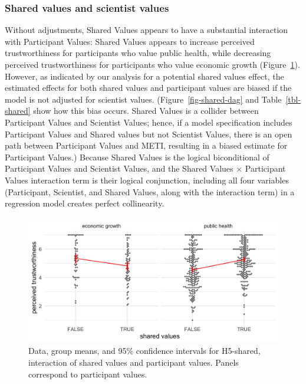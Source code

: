 \documentclass[
  letterpaper,
  DIV=11,
  numbers=noendperiod]{scrartcl}
\begin{document}
\hypertarget{shared-values-and-scientist-values}{%
\subsubsection{Shared values and scientist
values}\label{shared-values-and-scientist-values}}

Without adjustments, Shared Values appears to have a substantial
interaction with Participant Values: Shared Values appears to increase
perceived trustworthiness for participants who value public health,
while decreasing perceived trustworthiness for participants who value
economic growth (Figure~\ref{fig-shared-part}). However, as indicated by
our analysis for a potential shared values effect, the estimated effects
for both shared values and participant values are biased if the model is
not adjusted for scientist values. (Figure~\ref{fig-shared-dag} and
Table~\ref{tbl-shared} show how this bias occurs. Shared Values is a
collider between Participant Values and Scientist Values; hence, if a
model specification includes Participant Values and Shared values but
not Scientist Values, there is an open path between Participant Values
and METI, resulting in a biased estimate for Participant Values.)
Because Shared Values is the logical biconditional of Participant Values
and Scientist Values, and the Shared Values \(\times\) Participant
Values interaction term is their logical conjunction, including all four
variables (Participant, Scientist, and Shared Values, along with the
interaction term) in a regression model creates perfect collinearity.

\begin{figure}

{\centering \includegraphics{fig5_shared_part.png}

}

\caption{\label{fig-shared-part}Data, group means, and 95\% confidence
intervals for H5-shared, interaction of shared values and participant
values. Panels correspond to participant values.}

\end{figure}
\end{document}
